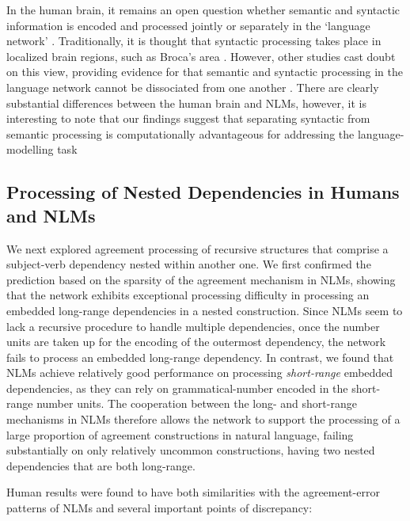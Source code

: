 In the human brain, it remains an open question whether semantic and syntactic information is encoded and processed jointly or separately in the `language network' \citep{pallier2011cortical}. Traditionally, it is thought that syntactic processing takes place in localized brain regions, such as Broca's area \citep[e.g.,][]{dapretto1999form}. However, other studies cast doubt on this view, providing evidence for that semantic and syntactic processing in the language network cannot be dissociated from one another \citep{mollica2018high, siegelman2019attempt, fedorenko2020lack}. There are clearly substantial differences between the human brain and NLMs, however, it is interesting to note that our findings suggest that separating syntactic from semantic processing is computationally advantageous for addressing the language-modelling task \citep[see, e.g.,][for related studies.]{ullman2004contributions, o2006biologically, russin2019reilly} 

\subsection{Processing of Nested Dependencies in Humans and NLMs}
We next explored agreement processing of recursive structures that comprise a subject-verb dependency nested within another one. We first confirmed the prediction based on the sparsity of the agreement mechanism in NLMs, showing that the network exhibits exceptional processing difficulty in processing an embedded long-range dependencies in a nested construction. Since NLMs seem to lack a recursive procedure to handle multiple dependencies, once the number units are taken up for the encoding of the outermost dependency, the network fails to process an embedded long-range dependency. In contrast, we found that NLMs achieve relatively good performance on processing \textit{short-range} embedded dependencies, as they can rely on grammatical-number encoded in the short-range number units. The cooperation between the long- and short-range mechanisms in NLMs therefore allows the network to support the processing of a large proportion of agreement constructions in natural language, failing substantially on only relatively uncommon constructions, having two nested dependencies that are both long-range. 

Human results were found to have both similarities with the agreement-error patterns of NLMs and several important points of discrepancy:

